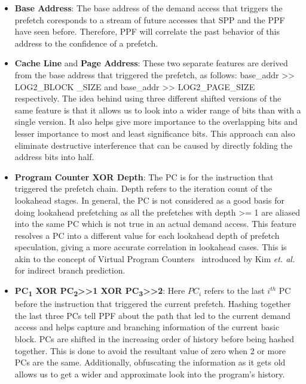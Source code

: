 \begin{itemize}
\item \textbf{Base Address}: The base address of the demand 
access that triggers the prefetch coresponds to a stream of 
future accesses that SPP and the PPF have seen before. 
Therefore, PPF will correlate the past behavior of this address 
to the confidence of a prefetch.

\item \textbf{Cache Line} and \textbf{Page Address}: These two
  separate features are derived from the base address that triggered
  the prefetch, as follows: base\_addr >> LOG2\_BLOCK \_SIZE and
  base\_addr >> LOG2\_PAGE\_SIZE respectively. The idea behind using
  three different shifted versions of the same feature is that it
  allows us to look into a wider range of bits than with a single
  version.  It also helps give more importance to the overlapping bits
  and lesser importance to most and least significance bits. This
  approach can also eliminate destructive interference that can be
  caused by directly folding the address bits into half.


\item \textbf{Program Counter XOR Depth}: The PC is for the
  instruction that triggered the prefetch chain.  Depth refers to the
  iteration count of the lookahead stages.  In general, the PC is not
  considered as a good basis for doing lookahead prefetching as all
  the prefetches with depth >= 1 are aliased into the same PC which
  is not true in an actual demand access.  This feature resolves
  a PC into a different value for each lookahead depth of prefetch
  speculation, giving a more accurate correlation in lookahead cases.
  This is akin to the concept of Virtual Program Counters~\cite{VPC}
  introduced by Kim \textit{et. al.} for indirect branch prediction.

\item \textbf{PC\textsubscript{1} XOR PC\textsubscript{2}>>1 XOR
    PC\textsubscript{3}>>2}: Here $PC_i$ refers to the last $i^{th}$
  PC before the instruction that triggered the current prefetch.
  Hashing together the last three PCs tell PPF about the path that led
  to the current demand access and helps capture and branching
  information of the current basic block.  PCs are shifted in the
  increasing order of history before being hashed together.  This is
  done to avoid the resultant value of zero when 2 or more PCs are the
  same.  Additionally, obfuscating the information as it gets old
  allows us to get a wider and approximate look into the program's
  history.


\end{itemize}
